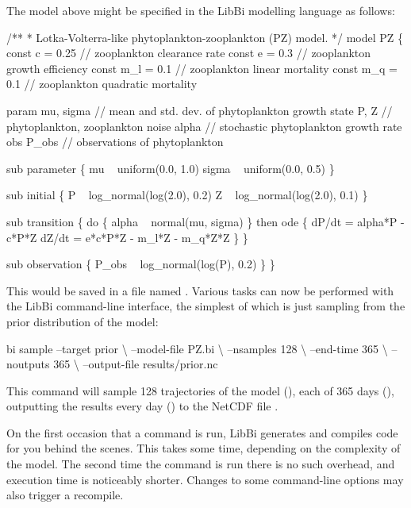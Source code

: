 The model above might be specified in the LibBi modelling language as follows:
\begin{bicode}
/**
 * Lotka-Volterra-like phytoplankton-zooplankton (PZ) model.
 */
model PZ \{
  const c = 0.25   // zooplankton clearance rate
  const e = 0.3    // zooplankton growth efficiency
  const m_l = 0.1  // zooplankton linear mortality
  const m_q = 0.1  // zooplankton quadratic mortality

  param mu, sigma  // mean and std. dev. of phytoplankton growth
  state P, Z       // phytoplankton, zooplankton
  noise alpha      // stochastic phytoplankton growth rate
  obs P_obs        // observations of phytoplankton
  
  sub parameter \{
    mu ~ uniform(0.0, 1.0)
    sigma ~ uniform(0.0, 0.5)
  \}
  
  sub initial \{
    P ~ log_normal(log(2.0), 0.2)
    Z ~ log_normal(log(2.0), 0.1)
  \}

  sub transition \{
    do \{
      alpha ~ normal(mu, sigma)
    \} then ode \{
      dP/dt = alpha*P - c*P*Z
      dZ/dt = e*c*P*Z - m_l*Z - m_q*Z*Z
    \}
  \}

  sub observation \{
    P_obs ~ log_normal(log(P), 0.2)
  \}
\}
\end{bicode}

This would be saved in a file named . Various tasks can now be
performed with the LibBi command-line interface, the simplest of which is
just sampling from the prior distribution of the model:
\begin{cmdcode}
bi sample --target prior \textbackslash
    --model-file PZ.bi \textbackslash
    --nsamples 128 \textbackslash
    --end-time 365 \textbackslash
    --noutputs 365 \textbackslash
    --output-file results/prior.nc
\end{cmdcode}
This command will sample 128 trajectories of the model (), each of 365 days (), outputting the results
every day () to the NetCDF file
.

\begin{tip}
On the first occasion that a command is run, LibBi generates and compiles code
for you behind the scenes. This takes some time, depending on the complexity
of the model. The second time the command is run there is no such overhead,
and execution time is noticeably shorter. Changes to some command-line options
may also trigger a recompile.
\end{tip}

